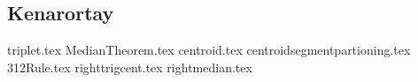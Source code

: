\subsection{Kenarortay}
{triplet.tex}
\newpage
{MedianTheorem.tex}
\newpage
{centroid.tex}
\newpage
{centroidsegmentpartioning.tex}
\newpage
{312Rule.tex}
\newpage
{righttrigcent.tex}
\newpage
{rightmedian.tex}
\newpage
